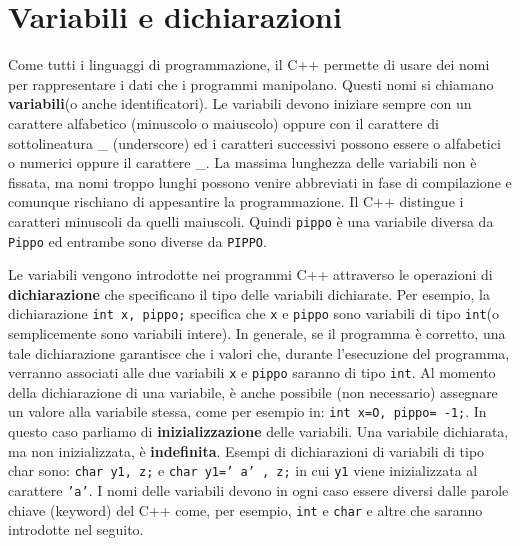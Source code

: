 \documentclass[a4paper,12pt]{book}
\begin{document}
\section{Variabili e dichiarazioni}
\noindent Come tutti i linguaggi di programmazione, il C++ permette di usare dei nomi per rappresentare i dati che i programmi manipolano.
Questi nomi si chiamano \textbf{variabili}(o anche identificatori).
Le variabili devono iniziare sempre con un carattere alfabetico (minuscolo o maiuscolo) oppure con il carattere di sottolineatura \_ (un­derscore) ed i caratteri successivi possono essere o alfabetici o numerici oppure il carattere \_.
La massima lunghezza delle variabili non è fissata, ma nomi troppo lunghi possono venire abbreviati in fase di compilazione e comunque rischiano di appesantire la programmazione.
Il C++ distingue i caratteri minuscoli da quelli maiuscoli.
Quindi \texttt{pippo} è una variabile diversa da \texttt{Pippo} ed entrambe sono diverse da \texttt{PIPPO}. 

Le variabili vengono introdotte nei programmi C++ attraverso le operazioni di \textbf{dichiarazione} che specificano il tipo delle variabili dichiarate.
Per esempio, la dichiarazione \texttt{int x, pippo;} specifica che \texttt{x} e \texttt{pippo} sono variabili di tipo \texttt{int}(o semplicemente sono variabili intere).
In generale, se il programma è corretto, una tale dichiarazione garantisce che i valori che, durante l'esecuzione del programma, verranno associati alle due variabili \texttt{x} e \texttt{pippo} saranno di tipo \texttt{int}.
Al momento della dichiarazione di una variabile, è anche possibile (non necessario) assegnare un valore alla variabile stessa, come per esempio in: \texttt{int x=O, pippo= -1;}.
In questo caso parliamo di \textbf{inizializzazione} delle variabili.
Una variabile dichiarata, ma non inizializzata, è \textbf{indefinita}.
Esempi di dichiarazioni di variabili di tipo char sono: \texttt{char y1, z;} e \texttt{char y1=' a' , z;} in cui \texttt{y1} viene inizializzata al carattere \texttt{'a'}.
I nomi delle variabili devono in ogni caso essere diversi dalle parole chiave (keyword) del C++ come, per esempio, \texttt{int} e \texttt{char} e altre che saranno introdotte nel seguito. 
\end{document}
